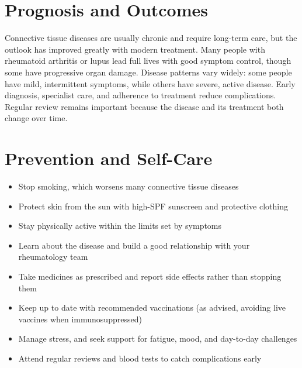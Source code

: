 \section*{Prognosis and Outcomes}
Connective tissue diseases are usually chronic and require long-term care, but the outlook has improved greatly with modern treatment. Many people with rheumatoid arthritis or lupus lead full lives with good symptom control, though some have progressive organ damage. Disease patterns vary widely: some people have mild, intermittent symptoms, while others have severe, active disease. Early diagnosis, specialist care, and adherence to treatment reduce complications. Regular review remains important because the disease and its treatment both change over time.

\section*{Prevention and Self-Care}
\begin{itemize}
    \item Stop smoking, which worsens many connective tissue diseases
    \item Protect skin from the sun with high-SPF sunscreen and protective clothing
    \item Stay physically active within the limits set by symptoms
    \item Learn about the disease and build a good relationship with your rheumatology team
    \item Take medicines as prescribed and report side effects rather than stopping them
    \item Keep up to date with recommended vaccinations (as advised, avoiding live vaccines when immunosuppressed)
    \item Manage stress, and seek support for fatigue, mood, and day-to-day challenges
    \item Attend regular reviews and blood tests to catch complications early
\end{itemize}
